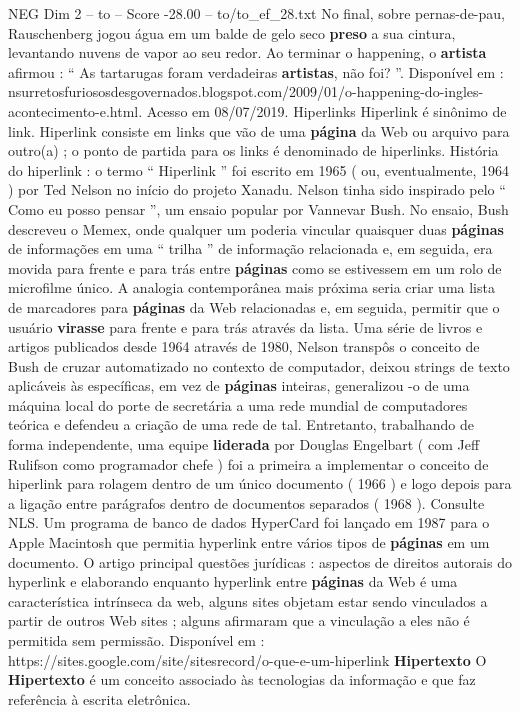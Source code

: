 \begin{textsample}{NEG Dim 2 – to – Score -28.00 – to/to\_ef\_28.txt}
No final, sobre pernas-de-pau, Rauschenberg jogou água em um balde de gelo seco \textbf{preso} a sua cintura, levantando nuvens de vapor ao seu redor.
Ao terminar o happening, o \textbf{artista} afirmou : “ As tartarugas foram verdadeiras \textbf{artistas}, não foi? ”.
Disponível em : nsurretosfuriososdesgovernados.blogspot.com/2009/01/o-happening-do-ingles-acontecimento-e.html.
Acesso em 08/07/2019.
Hiperlinks Hiperlink é sinônimo de link.
Hiperlink consiste em links que vão de uma \textbf{página} da Web ou arquivo para outro(a) ; o ponto de partida para os links é denominado de hiperlinks.
História do hiperlink : o termo “ Hiperlink ” foi escrito em 1965 ( ou, eventualmente, 1964 ) por Ted Nelson no início do projeto Xanadu.
Nelson tinha sido inspirado pelo “ Como eu posso pensar ”, um ensaio popular por Vannevar Bush.
No ensaio, Bush descreveu o Memex, onde qualquer um poderia vincular quaisquer duas \textbf{páginas} de informações em uma “ trilha ” de informação relacionada e, em seguida, era movida para frente e para trás entre \textbf{páginas} como se estivessem em um rolo de microfilme único.
A analogia contemporânea mais próxima seria criar uma lista de marcadores para \textbf{páginas} da Web relacionadas e, em seguida, permitir que o usuário \textbf{virasse} para frente e para trás através da lista.
Uma série de livros e artigos publicados desde 1964 através de 1980, Nelson transpôs o conceito de Bush de cruzar automatizado no contexto de computador, deixou strings de texto aplicáveis às específicas, em vez de \textbf{páginas} inteiras, generalizou -o de uma máquina local do porte de secretária a uma rede mundial de computadores teórica e defendeu a criação de uma rede de tal.
Entretanto, trabalhando de forma independente, uma equipe \textbf{liderada} por Douglas Engelbart ( com Jeff Rulifson como programador chefe ) foi a primeira a implementar o conceito de hiperlink para rolagem dentro de um único documento ( 1966 ) e logo depois para a ligação entre parágrafos dentro de documentos separados ( 1968 ).
Consulte NLS.
Um programa de banco de dados HyperCard foi lançado em 1987 para o Apple Macintosh que permitia hyperlink entre vários tipos de \textbf{páginas} em um documento.
O artigo principal questões jurídicas : aspectos de direitos autorais do hyperlink e elaborando enquanto hyperlink entre \textbf{páginas} da Web é uma característica intrínseca da web, alguns sites objetam estar sendo vinculados a partir de outros Web sites ; alguns afirmaram que a vinculação a eles não é permitida sem permissão.
Disponível em : https://sites.google.com/site/sitesrecord/o-que-e-um-hiperlink \textbf{Hipertexto} O \textbf{Hipertexto} é um conceito associado às tecnologias da informação e que faz referência à escrita eletrônica.

\end{textsample}
